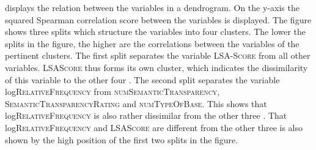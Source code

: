 
 \begin{table}

	\caption{Correlation matrix for decomposability measures in corpus study}
	\label{tab: Correlation matrix for all decomposability measures in corpus study}
	

 \end{table}
 
 
 


 

 
   displays the relation between the variables in a dendrogram. On the y-axis the squared Spearman correlation score between the variables is displayed. 
  The figure shows three splits which structure the variables into four clusters. The lower the splits in the figure, the higher are the correlations between the variables of the pertinent clusters.
      The first split separates the  variable \textsc{LSA-Score} from all other variables. \textsc{LSAScore} thus forms its own cluster, which indicates the dissimilarity of this variable to the other four . The second split separates the variable log\textsc{RelativeFrequency} from \textsc{numSemanticTransparency}, \textsc{SemanticTransparencyRating} and \textsc{numTypeOfBase}. This shows that log\textsc{RelativeFrequency} is also rather dissimilar from the other three . 
      That log\textsc{RelativeFrequency} and \textsc{LSAScore} are different from the other three  is also shown by the high position of the first two splits in the figure.
      
